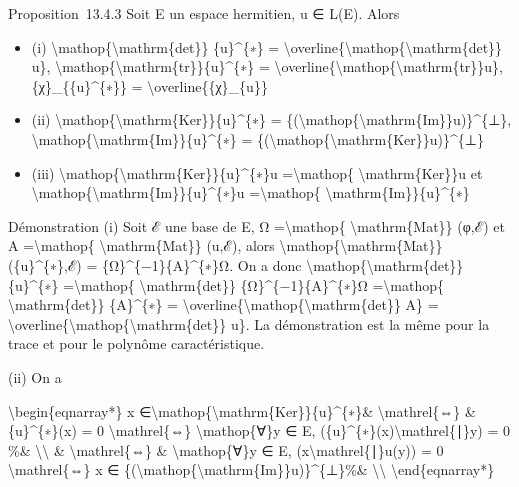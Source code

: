 \documentclass[]{article}
\begin{document}
Proposition~13.4.3 Soit E un espace hermitien, u ∈ L(E). Alors

\begin{itemize}
\itemsep1pt\parskip0pt
\item
  (i) \textbackslash{}mathop\{\textbackslash{}mathrm\{det\}\}
  \{u\}\^{}\{∗\} =
  \textbackslash{}overline\{\textbackslash{}mathop\{\textbackslash{}mathrm\{det\}\}
  u\},
  \textbackslash{}mathop\{\textbackslash{}mathrm\{tr\}\}\{u\}\^{}\{∗\} =
  \textbackslash{}overline\{\textbackslash{}mathop\{\textbackslash{}mathrm\{tr\}\}u\},
  \{χ\}\_\{\{u\}\^{}\{∗\}\} = \textbackslash{}overline\{\{χ\}\_\{u\}\}
\item
  (ii)
  \textbackslash{}mathop\{\textbackslash{}mathrm\{Ker\}\}\{u\}\^{}\{∗\}
  =
  \{(\textbackslash{}mathop\{\textbackslash{}mathrm\{Im\}\}u)\}\^{}\{⊥\},
  \textbackslash{}mathop\{\textbackslash{}mathrm\{Im\}\}\{u\}\^{}\{∗\} =
  \{(\textbackslash{}mathop\{\textbackslash{}mathrm\{Ker\}\}u)\}\^{}\{⊥\}
\item
  (iii)
  \textbackslash{}mathop\{\textbackslash{}mathrm\{Ker\}\}\{u\}\^{}\{∗\}u
  =\textbackslash{}mathop\{ \textbackslash{}mathrm\{Ker\}\}u et
  \textbackslash{}mathop\{\textbackslash{}mathrm\{Im\}\}\{u\}\^{}\{∗\}u
  =\textbackslash{}mathop\{ \textbackslash{}mathrm\{Im\}\}\{u\}\^{}\{∗\}
\end{itemize}

Démonstration (i) Soit ℰ une base de E, Ω =\textbackslash{}mathop\{
\textbackslash{}mathrm\{Mat\}\} (φ,ℰ) et A =\textbackslash{}mathop\{
\textbackslash{}mathrm\{Mat\}\} (u,ℰ), alors
\textbackslash{}mathop\{\textbackslash{}mathrm\{Mat\}\}
(\{u\}\^{}\{∗\},ℰ) = \{Ω\}\^{}\{−1\}\{A\}\^{}\{∗\}Ω. On a donc
\textbackslash{}mathop\{\textbackslash{}mathrm\{det\}\} \{u\}\^{}\{∗\}
=\textbackslash{}mathop\{ \textbackslash{}mathrm\{det\}\}
\{Ω\}\^{}\{−1\}\{A\}\^{}\{∗\}Ω =\textbackslash{}mathop\{
\textbackslash{}mathrm\{det\}\} \{A\}\^{}\{∗\} =
\textbackslash{}overline\{\textbackslash{}mathop\{\textbackslash{}mathrm\{det\}\}
A\} =
\textbackslash{}overline\{\textbackslash{}mathop\{\textbackslash{}mathrm\{det\}\}
u\}. La démonstration est la même pour la trace et pour le polynôme
caractéristique.

(ii) On a

\textbackslash{}begin\{eqnarray*\} x
∈\textbackslash{}mathop\{\textbackslash{}mathrm\{Ker\}\}\{u\}\^{}\{∗\}\&
\textbackslash{}mathrel\{⇔\} \& \{u\}\^{}\{∗\}(x) = 0
\textbackslash{}mathrel\{⇔\} \textbackslash{}mathop\{∀\}y ∈ E,
(\{u\}\^{}\{∗\}(x)\textbackslash{}mathrel\{∣\}y) = 0 \%\&
\textbackslash{}\textbackslash{} \& \textbackslash{}mathrel\{⇔\} \&
\textbackslash{}mathop\{∀\}y ∈ E, (x\textbackslash{}mathrel\{∣\}u(y)) =
0 \textbackslash{}mathrel\{⇔\} x ∈
\{(\textbackslash{}mathop\{\textbackslash{}mathrm\{Im\}\}u)\}\^{}\{⊥\}\%\&
\textbackslash{}\textbackslash{} \textbackslash{}end\{eqnarray*\}
\end{document}
